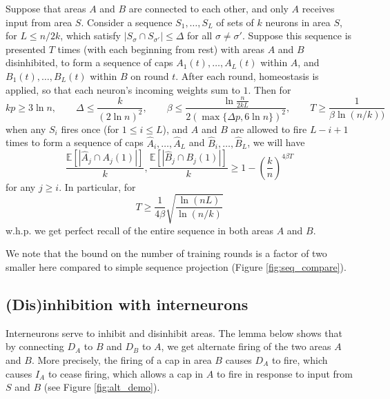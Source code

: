 \documentclass[12pt,nosubfloats]{alt2024} %
\newcommand{\E}{\mathbb{E}}
\newcommand{\1}{\mathbbm{1}}
\begin{document}
\begin{theorem} \label{thm:scaffold}
Suppose that areas $A$ and $B$ are connected to each other, and only $A$ receives input from area $S$. Consider a sequence $S_1, \ldots, S_L$ of sets of $k$ neurons in area $S$, for $L \le n / 2k$, which satisfy $|S_{\sigma} \cap S_{\sigma'}| \le \Delta$ for all $\sigma \neq \sigma'$. Suppose this sequence is presented $T$ times (with each beginning from rest) with areas $A$ and $B$ disinhibited, to form a sequence of caps $A_1(t), \ldots, A_L(t)$ within $A$, and $B_1(t), \ldots, B_L(t)$ within $B$ on round $t$. After each round, homeostasis is applied, so that each neuron's incoming weights sum to $1$. Then for 
\[ kp \ge 3 \ln n, \qquad \Delta \le \frac{k}{(2\ln n)^2}, \qquad \beta \le \frac{\ln \frac{n}{2kL}}{2 (\max \{\Delta p, 6 \ln n\})^2 }, \qquad T \ge \frac{1}{\beta \ln (n/k))}\]
when any $S_i$ fires once (for $1 \le i \le L$), and $A$ and $B$ are allowed to fire $L-i+1$ times to form a sequence of caps $\widehat A_i, \ldots, \widehat A_L$ and $\widehat B_i, \ldots, \widehat B_L$, we will have
\[\frac{\E[|\widehat A_j \cap A_j(1)|]}{k}, \frac{\E[|\widehat B_j \cap B_j(1)|]}{k} \ge 1 - \left(\frac{k}{n}\right)^{4 \beta T}\]
for any $j \ge i$.
In particular, for 
\[T \ge \frac{1}{4 \beta}\sqrt{\frac{\ln(nL)}{\ln (n/k)}}\]
w.h.p. we get perfect recall of the entire sequence in both areas $A$ and $B$.
\end{theorem}

We note that the bound on the number of training rounds is a factor of two smaller here compared to simple sequence projection (Figure \ref{fig:seq_compare}).

\subsection{(Dis)inhibition with interneurons}

Interneurons serve to inhibit and disinhibit areas. The lemma below shows that by connecting $D_A$ to $B$ and $D_B$ to $A$, we get alternate firing of the two areas $A$ and $B$. More precisely, the firing of a cap in area $B$ causes $D_A$ to fire, which causes $I_A$ to cease firing, which allows a cap in $A$ to fire in response to input from $S$ and $B$ (see Figure \ref{fig:alt_demo}).
\end{document}
